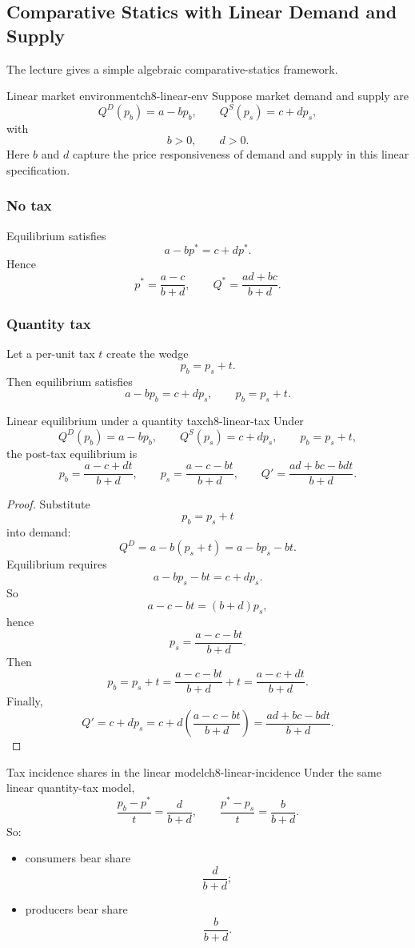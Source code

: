 \subsection{Comparative Statics with Linear Demand and Supply}

The lecture gives a simple algebraic comparative-statics framework.

\begin{definition}{Linear market environment}{ch8-linear-env}
Suppose market demand and supply are
\[
Q^D(p_b)=a-bp_b,
\qquad
Q^S(p_s)=c+dp_s,
\]
with
\[
b>0, \qquad d>0.
\]
Here $b$ and $d$ capture the price responsiveness of demand and supply in this linear specification.
\end{definition}

\subsubsection{No tax}

Equilibrium satisfies
\[
a-bp^*=c+dp^*.
\]
Hence
\[
p^*=\frac{a-c}{b+d},
\qquad
Q^*=\frac{ad+bc}{b+d}.
\]

\subsubsection{Quantity tax}

Let a per-unit tax $t$ create the wedge
\[
p_b=p_s+t.
\]
Then equilibrium satisfies
\[
a-bp_b=c+dp_s,
\qquad
p_b=p_s+t.
\]

\begin{theorem}{Linear equilibrium under a quantity tax}{ch8-linear-tax}
Under
\[
Q^D(p_b)=a-bp_b,
\qquad
Q^S(p_s)=c+dp_s,
\qquad
p_b=p_s+t,
\]
the post-tax equilibrium is
\[
p_b=\frac{a-c+dt}{b+d},
\qquad
p_s=\frac{a-c-bt}{b+d},
\qquad
Q'=\frac{ad+bc-bdt}{b+d}.
\]
\end{theorem}

\begin{proof}
Substitute
\[
p_b=p_s+t
\]
into demand:
\[
Q^D=a-b(p_s+t)=a-bp_s-bt.
\]
Equilibrium requires
\[
a-bp_s-bt=c+dp_s.
\]
So
\[
a-c-bt=(b+d)p_s,
\]
hence
\[
p_s=\frac{a-c-bt}{b+d}.
\]
Then
\[
p_b=p_s+t
=
\frac{a-c-bt}{b+d}+t
=
\frac{a-c+dt}{b+d}.
\]
Finally,
\[
Q'=c+dp_s
=
c+d\left(\frac{a-c-bt}{b+d}\right)
=
\frac{ad+bc-bdt}{b+d}.
\]
\end{proof}

\begin{theorem}{Tax incidence shares in the linear model}{ch8-linear-incidence}
Under the same linear quantity-tax model,
\[
\frac{p_b-p^*}{t}=\frac{d}{b+d},
\qquad
\frac{p^*-p_s}{t}=\frac{b}{b+d}.
\]
So:
\begin{itemize}
    \item consumers bear share
    \[
    \frac{d}{b+d};
    \]
    \item producers bear share
    \[
    \frac{b}{b+d}.
    \]
\end{itemize}
\end{theorem}


